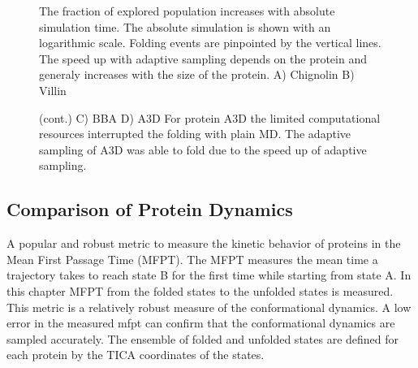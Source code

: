 \begin{figure}[H]
\centering
   \begin{subfigure}[b]{0.6\linewidth}
   {}
   \end{subfigure}%
   
   \begin{subfigure}[b]{0.6\linewidth}
   {}
   \end{subfigure}%


  \caption{The fraction of explored population increases with absolute simulation time. The absolute simulation is shown with an logarithmic scale. Folding events are pinpointed by the vertical lines. The speed up with adaptive sampling depends on the protein and generaly increases with the size of the protein. A) Chignolin B) Villin }
\end{figure}

\begin{figure}[H]\ContinuedFloat
\centering
   \begin{subfigure}[b]{0.6\linewidth}
   {}
    \end{subfigure}%

   \begin{subfigure}[b]{0.6\linewidth}
   {}
    \end{subfigure}%
  \caption{(cont.)  C) BBA D) A3D For protein A3D the limited computational resources interrupted the folding with plain MD. The adaptive sampling of A3D was able to fold due to the speed up of adaptive sampling.}
  \label{fig:Pop_explored}
\end{figure}





\subsection{\label{sec:kinetics}Comparison of Protein Dynamics}



A popular and robust metric to measure the kinetic behavior of proteins in the Mean First Passage Time (MFPT). The MFPT measures the mean time a trajectory takes to reach state B for the first time while starting from state A. In this chapter MFPT from the folded states to the unfolded states is measured. This metric is a relatively robust measure of the conformational dynamics. A low error in the measured mfpt can confirm that the conformational dynamics are sampled accurately. The ensemble of folded and unfolded states are defined for each protein by the TICA coordinates of the states. 

